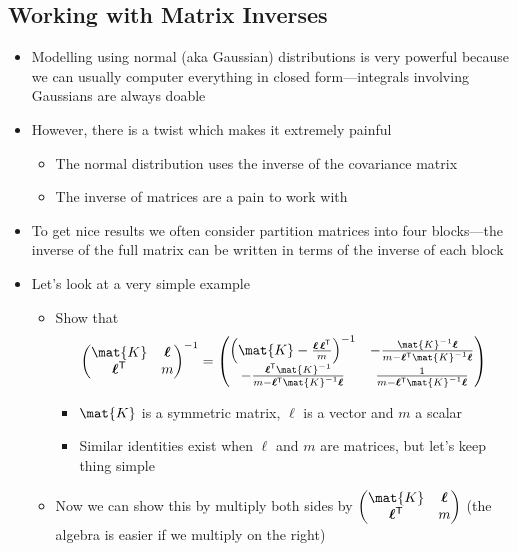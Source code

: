 \documentclass[11pt]{article}
\newcommand{\tr}{\textsf{T}}
\newcommand{\vl}{\bm{\ell}}
\begin{document}
\subsection{Working with Matrix Inverses}
\label{sec:org53bb480}
\begin{itemize}
\item Modelling using normal (aka Gaussian) distributions is very
powerful because we can usually computer everything in closed
form---integrals involving Gaussians are always doable
\item However, there is a twist which makes it extremely painful
\begin{itemize}
\item The normal distribution uses the inverse of the covariance matrix
\item The inverse of matrices are a pain to work with
\end{itemize}
\item To get nice results we often consider partition matrices into
four blocks---the inverse of the full matrix can be written in
terms of the inverse of each block
\item Let's look at a very simple example
\begin{itemize}
\item Show that
$$ \begin{pmatrix} \mat{K} & \vl \\ \vl^\tr & m \end{pmatrix}^{-1} 
       =  \begin{pmatrix} \left(\mat{K}-\frac{\vl\,\vl^\tr}{m}\right)^{-1}  &
            -\frac{\mat{K}^{-1} \vl}{m-\vl^\tr \mat{K}^{-1}\vl}  \\ 
	    -\frac{\vl^\tr\mat{K}^{-1}}{m-\vl^\tr \mat{K}^{-1}\vl} &
	    \frac{1}{m-\vl^\tr \mat{K}^{-1}\vl} 
       \end{pmatrix} $$
\begin{itemize}
\item \(\mat{K}\) is a symmetric matrix, \(\ell\) is a vector and \(m\) a
scalar
\item Similar identities exist when \(\ell\) and \(m\) are matrices,
but let's keep thing simple
\end{itemize}
\item Now we can show this by multiply both sides by \(\begin{pmatrix}
       \mat{K} & \vl \\ \vl^\tr & m \end{pmatrix}\) (the algebra is
easier if we multiply on the right)

\end{itemize}
\end{itemize}
\end{document}
